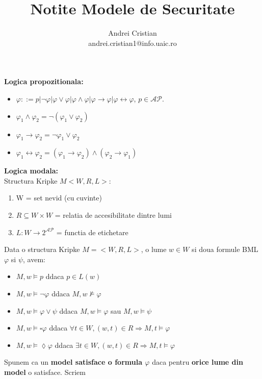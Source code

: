 \documentclass[10pt,a4paper,twocolumn]{report}
\author{Andrei Cristian\\andrei.cristian1@info.uaic.ro}
\title{Notite Modele de Securitate}
\begin{document}
\newcommand{\llbracket}{[\![}
\newcommand{\rrbracket}{]\!]}
\newcommand{\A}{\mathcal{A}}
\newcommand{\MM}{\mathcal{M}}
\newcommand{\LL}{\mathcal{L}}
\newcommand{\RR}{\mathcal{R}}
\newcommand{\UU}{\mathcal{U}}
\newcommand{\AP}{\mathcal{AP}}

\newcommand{\stcomp}[1]{\overline{#1}}

\maketitle
\textbf{Logica propozitionala:}
\begin{itemize}
\item $\varphi ::= p | \neg \varphi | \varphi \vee  \varphi | \varphi \wedge \varphi | \varphi \rightarrow \varphi | \varphi \leftrightarrow \varphi$, $p \in \mathcal{AP}$.
\item $\varphi_1 \wedge \varphi_2 = \neg ( \varphi_1 \vee \varphi_2 )$
\item $\varphi_1 \rightarrow \varphi_2 = \neg \varphi_1 \vee \varphi_2$
\item $\varphi_1 \leftrightarrow \varphi_2 = (\varphi_1 \rightarrow \varphi_2) \wedge (\varphi_2 \rightarrow \varphi_1)$
\end{itemize}
\textbf{Logica modala:}\\
Structura Kripke $M<W,R,L>$:
\begin{enumerate}
\item W = set nevid (cu cuvinte)
\item $R \subseteq W \times W$ = relatia de accesibilitate dintre lumi
\item $L : W \rightarrow 2^\mathcal{AP}$ = functia de etichetare
\end{enumerate}
Data o structura Kripke $M = < W, R, L >$, o lume $w \in W$ si doua formule BML $\varphi$ si $\psi$, avem:
\begin{itemize}
\item $M,w \models p$ ddaca $p \in L(w)$
\item $M,w \models \neg \varphi$ ddaca $M,w \not \models \varphi$
\item $M,w \models \varphi \vee \psi$ ddaca $M,w \models \varphi$ sau $M,w \models \psi$
\item $M,w \models \square \varphi$ ddaca $\forall t \in W, (w,t) \in R \Rightarrow M,t \models \varphi$
\item $M,w \models  \lozenge \varphi$ ddaca $\exists t \in W, (w,t) \in R \Rightarrow M,t \models \varphi$
\end{itemize}
Spunem ca un \textbf{model satisface o formula $\varphi$} daca pentru \textbf{orice lume din model} o satisface. Scriem
\end{document}
